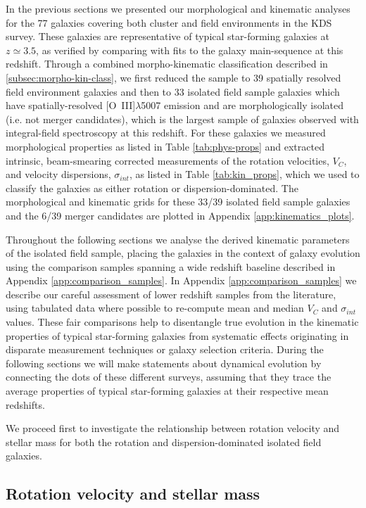 \documentclass[fleqn,usenatbib]{mnras}
\begin{document}
In the previous sections we presented our morphological and kinematic analyses for the 77 galaxies covering both cluster and field environments in the KDS survey.
These galaxies are representative of typical star-forming galaxies at $z\simeq3.5$, as verified by comparing with fits to the galaxy main-sequence at this redshift.
Through a combined morpho-kinematic classification described in \cref{subsec:morpho-kin-class}, we first reduced the sample to 39 spatially resolved field environment galaxies and then to 33 isolated field sample galaxies which have spatially-resolved [O~{\sc III}]$\lambda$5007 emission and are morphologically isolated (i.e. not merger candidates), which is the largest sample of galaxies observed with integral-field spectroscopy at this redshift.
For these galaxies we measured morphological properties as listed in Table \ref{tab:phys-props} and extracted intrinsic, beam-smearing corrected measurements of the rotation velocities, $V_{C}$, and velocity dispersions, $\sigma_{int}$, as listed in Table \ref{tab:kin_props}, which we used to classify the galaxies as either rotation or dispersion-dominated.
The morphological and kinematic grids for these 33/39 isolated field sample galaxies and the 6/39 merger candidates are plotted in Appendix \ref{app:kinematics_plots}.

Throughout the following sections we analyse the derived kinematic parameters of the isolated field sample, placing the galaxies in the context of galaxy evolution using the comparison samples spanning a wide redshift baseline described in Appendix \ref{app:comparison_samples}.
In Appendix \ref{app:comparison_samples} we describe our careful assessment of lower redshift samples from the literature, using tabulated data where possible to re-compute mean and median $V_{C}$ and $\sigma_{int}$ values.
These fair comparisons help to disentangle true evolution in the kinematic properties of typical star-forming galaxies from systematic effects originating in disparate measurement techniques or galaxy selection criteria.
During the following sections we will make statements about dynamical evolution by connecting the dots of these different surveys, assuming that they trace the average properties of typical star-forming galaxies at their respective mean redshifts.

We proceed first to investigate the relationship between rotation velocity and stellar mass for both the rotation and dispersion-dominated isolated field galaxies.

\subsection{Rotation velocity and stellar mass}\label{subsec:results_rotation_vel}
\end{document}
